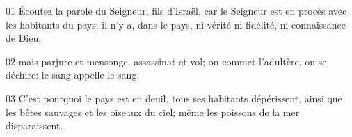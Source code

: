 01 Écoutez la parole du Seigneur, fils d’Israël, car le Seigneur est en procès avec les habitants du pays: il n’y a, dans le pays, ni vérité ni fidélité, ni connaissance de Dieu,

02 mais parjure et mensonge, assassinat et vol; on commet l’adultère, on se déchire: le sang appelle le sang.

03 C’est pourquoi le pays est en deuil, tous ses habitants dépérissent, ainsi que les bêtes sauvages et les oiseaux du ciel; même les poissons de la mer disparaissent.
